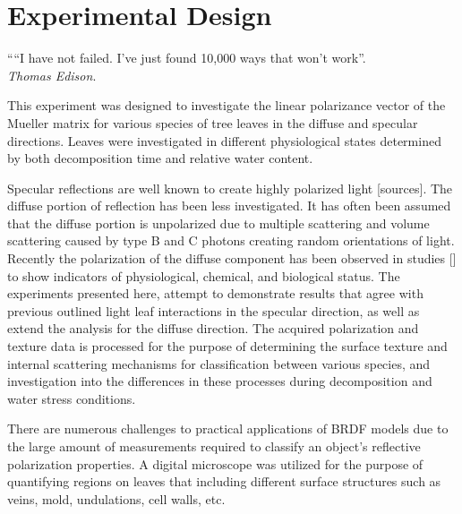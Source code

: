 \chapter{Experimental Design}
\begin{center}
  \begin{minipage}{0.75\textwidth}
    \begin{small}
      ““I have not failed. I've just found 10,000 ways that won't work”.\\
      \null\hfill\emph{Thomas Edison}.
    \end{small}
  \end{minipage}
  \vspace{0.5cm}
\end{center}

This experiment was designed to investigate the linear polarizance vector of the Mueller matrix for various species of tree leaves in the diffuse and specular directions.  Leaves were investigated in different physiological states determined by both decomposition time and relative water content.

Specular reflections are well known to create highly polarized light [sources]. The diffuse portion of reflection has been less investigated.  It has often been assumed that the diffuse portion is unpolarized due to multiple scattering and volume scattering caused by type B and C photons creating random orientations of light.  Recently the polarization of the diffuse component has been observed in studies [] to show indicators of physiological, chemical, and biological status.  The experiments presented here, attempt to demonstrate results that agree with previous outlined light leaf interactions in the specular direction, as well as extend the analysis for the diffuse direction.  The acquired polarization and texture data is processed for the purpose of determining the surface texture and internal scattering mechanisms for classification between various species, and investigation into the differences in these processes during decomposition and water stress conditions.

There are numerous challenges to practical applications of BRDF models due to the large amount of measurements required to classify an object's reflective polarization properties.  A digital microscope was utilized for the purpose of quantifying regions on leaves that including different surface structures such as veins, mold, undulations, cell walls, etc.

